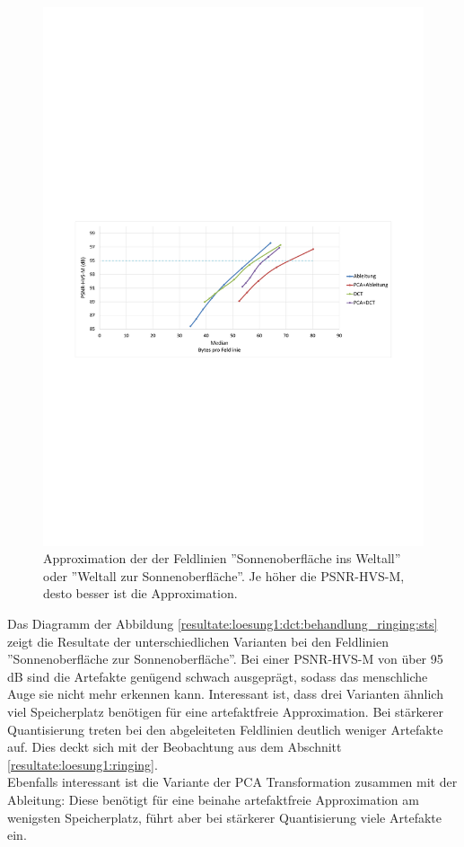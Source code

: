 \begin{figure}[!htbp]
	\center
\includegraphics[trim = 1.8cm 11cm 1.8cm 12.4cm, clip=true,width=1\textwidth,keepaspectratio]{./pictures/resultate/loesung1/ringing/nosts.pdf}
	\caption{Approximation der der Feldlinien ''Sonnenoberfläche ins Weltall'' oder ''Weltall zur Sonnenoberfläche''. Je höher die PSNR-HVS-M, desto besser ist die Approximation.}	\label{resultate:loesung1:dct:behandlung_ringing:nosts}
\end{figure}
Das Diagramm der Abbildung \ref{resultate:loesung1:dct:behandlung_ringing:sts} zeigt die Resultate der unterschiedlichen Varianten bei den Feldlinien ''Sonnenoberfläche zur Sonnenoberfläche''. Bei einer PSNR-HVS-M von über 95 dB sind die Artefakte genügend schwach ausgeprägt, sodass das menschliche Auge sie nicht mehr erkennen kann. Interessant ist, dass drei Varianten ähnlich viel Speicherplatz benötigen für eine artefaktfreie Approximation. Bei stärkerer Quantisierung treten bei den abgeleiteten Feldlinien deutlich weniger Artefakte auf. Dies deckt sich mit der Beobachtung aus dem Abschnitt \ref{resultate:loesung1:ringing}.\\
Ebenfalls interessant ist die Variante der PCA Transformation zusammen mit der Ableitung: Diese benötigt für eine beinahe artefaktfreie Approximation am wenigsten Speicherplatz, führt aber bei stärkerer Quantisierung viele Artefakte ein.

